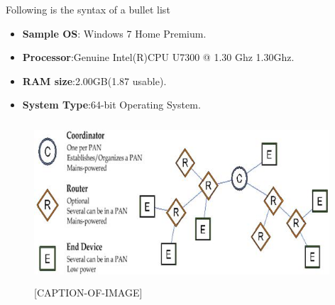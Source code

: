 
Following is the syntax of a bullet list

\begin{itemize}
	\item \textbf{Sample OS}: Windows 7 Home Premium.
	\item \textbf{Processor}:Genuine Intel(R)CPU U7300 @ 1.30 Ghz 1.30Ghz.
	\item \textbf{RAM size}:2.00GB(1.87 usable).
	\item \textbf{System Type}:64-bit Operating System.
\end{itemize}

\begin{figure}[htbp]
	\centering
	\includegraphics[width=11cm,height=6cm]{Network.JPG}
	\caption{[CAPTION-OF-IMAGE]}
\end{figure}
		
	

		                    


